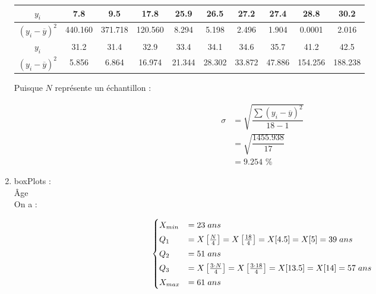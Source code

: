 \documentclass{article}
\begin{document}
\begin{enumerate}
\vspace{0.15cm}
\begin{center}
\begin{tabular}{ |c|c|c|c|c|c|c|c|c|c|} 
    \hline
    \(y_i\) & 7.8 & 9.5 & 17.8 & 25.9 & 26.5  & 27.2 & 27.4 & 28.8 & 30.2\\  
    \hline
    \((y_i - \overline{y})^2\) & 440.160 & 371.718 & 120.560 & 8.294 & 5.198 & 2.496  & 1.904 & 0.0001 & 2.016  \\
    \hline
    \(y_i\) & 31.2 & 31.4 &  32.9 & 33.4 & 34.1 & 34.6 & 35.7 & 41.2 & 42.5\\ 
    \hline
    \((y_i - \overline{y})^2\) & 5.856 & 6.864 & 16.974 & 21.344 & 28.302 & 33.872 & 47.886 & 154.256 & 188.238 \\
    \hline
\end{tabular}
\end{center}

\vspace{0.35cm}

Puisque \(N\) représente un échantillon :

\begin{align*}
        \sigma & =\sqrt{\dfrac{\sum (y_i - \overline{y})^2}{18-1}}\\ 
               & = \sqrt{\dfrac{1455.938}{17}}\\
               & =\boxed{9.254 \textit{ \%}}
\end{align*}



\item boxPlots :\\[0.15cm]
    Âge\\[0.1cm]
On a :

\[
    \begin{cases}
        X_{min} &= 23 \hspace{0.1cm} ans \\[0.1cm] 
        Q_1 &= X\left[\frac{N}{4}\right]  = X\left[\frac{18}{4}\right]=X[4.5]=X[5]= 39\hspace{0.1cm}  ans  \\[0.1cm]
        Q_2 &= 51\hspace{0.1cm}  ans  \\[0.1cm]
        Q_3 &= X\left[\frac{3\cdot N}{4}\right]  = X\left[\frac{3\cdot 18}{4}\right]=X[13.5]=X[14]= 57\hspace{0.1cm}  ans  \\[0.1cm]
        X_{max} &= 61\hspace{0.1cm}  ans  
    \end{cases}
    \]


\end{enumerate}
\end{document}
